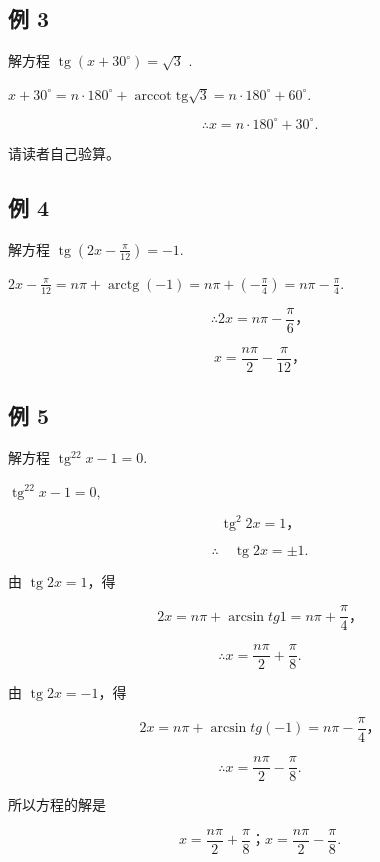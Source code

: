 \subsection{例 3}

解方程 \(\operatorname{tg}(x+30^{\circ})=\sqrt{3}\) .

\(x + 30^{\circ} = n\cdot 180^{\circ} + \operatorname {arccot}\mathrm{tg}\sqrt{3} = n\cdot 180^{\circ} + 60^{\circ}.\)

\[
\therefore x = n \cdot 180 ^{\circ} + 30 ^{\circ}.
\]

请读者自己验算。

\subsection{例 4}

解方程 \(\operatorname{tg}\left(2x - \frac{\pi}{12}\right) = -1.\)

\(2x - \frac{\pi}{12} = n\pi + \operatorname{arctg}(-1) = n\pi + \left(-\frac{\pi}{4}\right) = n\pi - \frac{\pi}{4}\).

\[
\therefore 2 x = n \pi - \frac {\pi}{6}\text{，}
\]

\[
x = \frac {n \pi}{2} - \frac {\pi}{12}\text{，}
\]

\subsection{例 5}

解方程 \(\operatorname{tg}^22x - 1 = 0\).

 \(\operatorname{tg}^22x - 1 = 0,\)

\[
\operatorname{tg} ^ {2} 2 x = 1\text{，}
\]

\[
\therefore \quad \operatorname{tg} 2 x = \pm 1.
\]

由 \(\operatorname{tg} 2x = 1\)，得

\[
2 x = n \pi + \arcsin t g 1 = n \pi + \frac {\pi}{4}\text{，}
\]

\[
\therefore x = \frac {n \pi}{2} + \frac {\pi}{8}.
\]

由 \(\operatorname{tg} 2x = -1\)，得

\[
2 x = n \pi + \arcsin t g (- 1) = n \pi - \frac {\pi}{4}\text{，}
\]

\[
\therefore x = \frac {n \pi}{2} - \frac {\pi}{8}.
\]

所以方程的解是

\[
x = \frac {n \pi}{2} + \frac {\pi}{8}\text{；} x = \frac {n \pi}{2} - \frac {\pi}{8}.
\]

